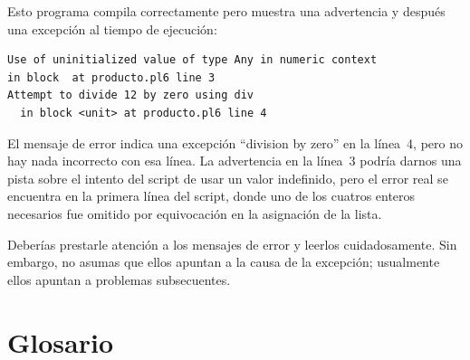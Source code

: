 Esto programa compila correctamente pero muestra una
advertencia y después una excepción al tiempo de ejecución:

\begin{verbatim}
Use of uninitialized value of type Any in numeric context 
in block  at producto.pl6 line 3
Attempt to divide 12 by zero using div
  in block <unit> at producto.pl6 line 4
\end{verbatim}
%

El mensaje de error indica una excepción ``division by zero''
en la línea~4, pero no hay nada
incorrecto con esa línea. La advertencia en la línea~3
podría darnos una pista sobre el intento del script 
de usar un valor indefinido, pero el error real se encuentra 
en la primera línea del script, donde uno de los cuatros 
enteros necesarios fue omitido por equivocación en la
asignación de la lista.


Deberías prestarle atención a los mensajes de error y leerlos
cuidadosamente. Sin embargo, no asumas que ellos apuntan a la
causa de la excepción; usualmente ellos apuntan 
a problemas subsecuentes.


\section{Glosario}

